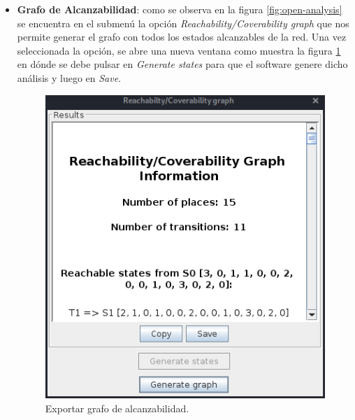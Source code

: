 \begin{itemize}
\begin{itemize}
        \item \textbf{Grafo de Alcanzabilidad}: como se observa en la figura \ref{fig:open-analysis} se encuentra en el submenú la opción \textit{Reachability/Coverability graph} que nos permite generar el grafo con todos los estados alcanzables de la red.
        Una vez seleccionada la opción, se abre una nueva ventana como muestra la figura \ref{fig:ext-grafo} en dónde se debe pulsar en \textit{Generate states} para que el software genere dicho análisis y luego en \textit{Save}.
        \begin{figure} [H]
            \centering
            \includegraphics[scale=0.7]{Figures/petrinator/grafo.png}
            \caption{Exportar grafo de alcanzabilidad.}
            \label{fig:ext-grafo}
        \end{figure}
        

\end{itemize}
\end{itemize}
